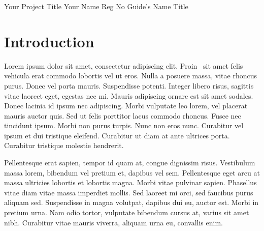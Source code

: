 \documentclass{vitmsprojectreport}
\begin{document}

\maketitlepage%
{Your Project Title}%
{Your Name}%
{Reg No}%
{Guide's Name}%
{Title}%

\makedeclarationpage%

\makebonafidepage%

\makeackpage%

\makeexecsummarypage%

\tableofcontents  %
\clearpage
\listoffigures    %
\clearpage
\listoftables     %
\clearpage

\setcounter{page}{1}


\chapter{Introduction}

Lorem ipsum dolor sit amet, consectetur adipiscing elit. Proin~\cite{fowler2004uml} sit amet felis vehicula erat commodo lobortis vel ut eros. Nulla a posuere massa, vitae rhoncus purus. Donec vel porta mauris. Suspendisse potenti. Integer libero risus, sagittis vitae laoreet eget, egestas nec mi. Mauris adipiscing ornare est sit amet sodales. Donec lacinia id ipsum nec adipiscing. Morbi vulputate leo lorem, vel placerat mauris auctor quis. Sed ut felis porttitor lacus commodo rhoncus. Fusce nec tincidunt ipsum. Morbi non purus turpis. Nunc non eros nunc. Curabitur vel ipsum et dui tristique eleifend. Curabitur ut diam at ante ultrices porta. Curabitur tristique molestie hendrerit.

Pellentesque erat sapien, tempor id quam at, congue dignissim risus. Vestibulum massa lorem, bibendum vel pretium et, dapibus vel sem. Pellentesque eget arcu at massa ultricies lobortis et lobortis magna. Morbi vitae pulvinar sapien. Phasellus vitae diam vitae massa imperdiet mollis. Sed laoreet mi orci, sed faucibus purus aliquam sed. Suspendisse in magna volutpat, dapibus dui eu, auctor est. Morbi in pretium urna. Nam odio tortor, vulputate bibendum cursus at, varius sit amet nibh. Curabitur vitae mauris viverra, aliquam urna eu, convallis enim.
\end{document}
